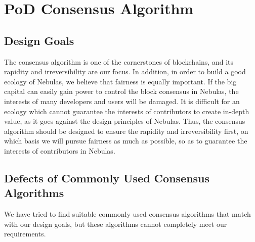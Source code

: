 \section{PoD Consensus Algorithm}
\label{sec:pod}

\subsection{Design Goals}
\label{pod:goals}

The consensus algorithm is one of the cornerstones of blockchains, and its rapidity and irreversibility are our focus. In addition, in order to build a good ecology of Nebulas, we believe that fairness is equally important. If the big capital can easily gain power to control the block consensus in Nebulas, the interests of many developers and users will be damaged. It is difficult for an ecology which cannot guarantee the interests of contributors to create in-depth value, as it goes against the design principles of Nebulas. Thus, the consensus algorithm should be designed to ensure the rapidity and irreversibility first, on which basis we will pursue fairness as much as possible, so as to guarantee the interests of contributors in Nebulas.


\subsection{Defects of Commonly Used Consensus Algorithms}
\label{pod:weakness}

We have tried to find suitable commonly used consensus algorithms that match with our design goals, but these algorithms cannot completely meet our requirements.



